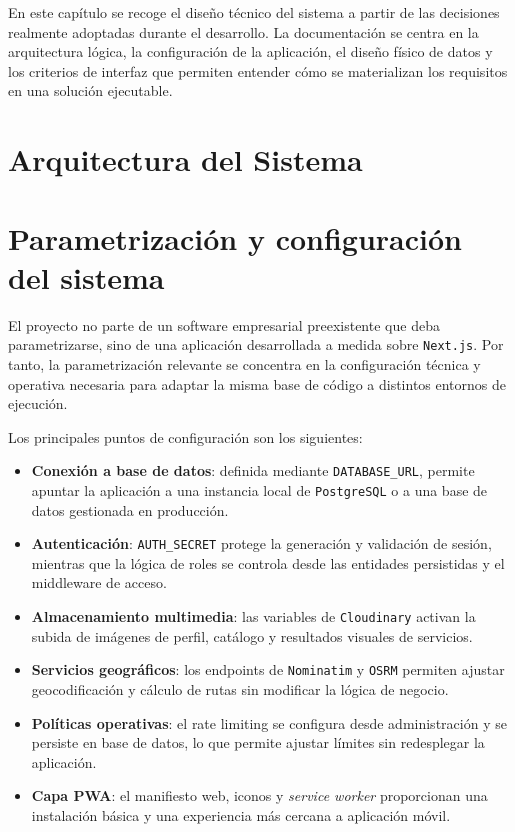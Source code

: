 En este capítulo se recoge el diseño técnico del sistema a partir de las decisiones realmente adoptadas durante el desarrollo. La documentación se centra en la arquitectura lógica, la configuración de la aplicación, el diseño físico de datos y los criterios de interfaz que permiten entender cómo se materializan los requisitos en una solución ejecutable.

\section{Arquitectura del Sistema}
\label{sec:SystemArchitecture}


\section{Parametrización y configuración del sistema}

El proyecto no parte de un software empresarial preexistente que deba parametrizarse, sino de una aplicación desarrollada a medida sobre \texttt{Next.js}. Por tanto, la parametrización relevante se concentra en la configuración técnica y operativa necesaria para adaptar la misma base de código a distintos entornos de ejecución.

Los principales puntos de configuración son los siguientes:

\begin{itemize}
    \item \textbf{Conexión a base de datos}: definida mediante \texttt{DATABASE\_URL}, permite apuntar la aplicación a una instancia local de \texttt{PostgreSQL} o a una base de datos gestionada en producción.
    \item \textbf{Autenticación}: \texttt{AUTH\_SECRET} protege la generación y validación de sesión, mientras que la lógica de roles se controla desde las entidades persistidas y el middleware de acceso.
    \item \textbf{Almacenamiento multimedia}: las variables de \texttt{Cloudinary} activan la subida de imágenes de perfil, catálogo y resultados visuales de servicios.
    \item \textbf{Servicios geográficos}: los endpoints de \texttt{Nominatim} y \texttt{OSRM} permiten ajustar geocodificación y cálculo de rutas sin modificar la lógica de negocio.
    \item \textbf{Políticas operativas}: el rate limiting se configura desde administración y se persiste en base de datos, lo que permite ajustar límites sin redesplegar la aplicación.
    \item \textbf{Capa PWA}: el manifiesto web, iconos y \textit{service worker} proporcionan una instalación básica y una experiencia más cercana a aplicación móvil.
\end{itemize}

